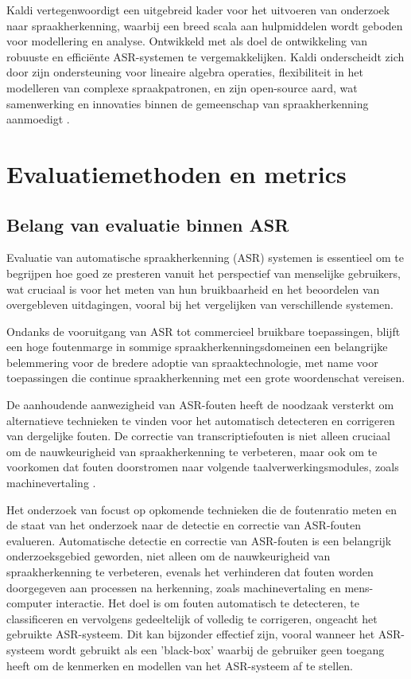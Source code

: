 Kaldi vertegenwoordigt een uitgebreid kader voor het uitvoeren van onderzoek naar spraakherkenning, waarbij een breed scala aan hulpmiddelen wordt geboden voor modellering en analyse. Ontwikkeld met als doel de ontwikkeling van robuuste en efficiënte ASR-systemen te vergemakkelijken. Kaldi onderscheidt zich door zijn ondersteuning voor lineaire algebra operaties, flexibiliteit in het modelleren van complexe spraakpatronen, en zijn open-source aard, wat samenwerking en innovaties binnen de gemeenschap van spraakherkenning aanmoedigt \autocite{Povey_ASRU2011}.


\section{Evaluatiemethoden en metrics}
\subsection{Belang van evaluatie binnen ASR}
Evaluatie van automatische spraakherkenning (ASR) systemen is essentieel 
om te begrijpen hoe goed ze presteren vanuit het perspectief van menselijke gebruikers, wat cruciaal is voor het meten van hun bruikbaarheid en het beoordelen van overgebleven uitdagingen, vooral bij het vergelijken van verschillende systemen. 

Ondanks de vooruitgang van ASR tot commercieel bruikbare toepassingen, blijft een hoge foutenmarge in sommige spraakherkenningsdomeinen een belangrijke belemmering voor de bredere adoptie van spraaktechnologie, met name voor toepassingen die continue spraakherkenning met een grote woordenschat vereisen.

De aanhoudende aanwezigheid van ASR-fouten heeft de noodzaak versterkt om alternatieve technieken te vinden voor het automatisch detecteren en corrigeren van dergelijke fouten. De correctie van transcriptiefouten is niet alleen cruciaal om de nauwkeurigheid van spraakherkenning te verbeteren, maar ook om te voorkomen dat fouten doorstromen naar volgende taalverwerkingsmodules, zoals machinevertaling \autocite{Errattahi_2018}.

Het onderzoek van \textcite{Errattahi_2018} focust op opkomende technieken die de foutenratio meten en de staat van het onderzoek naar de detectie en correctie van ASR-fouten evalueren. Automatische detectie en correctie van ASR-fouten is een belangrijk onderzoeksgebied geworden, niet alleen om de nauwkeurigheid van spraakherkenning te verbeteren, evenals het verhinderen dat fouten worden doorgegeven aan processen na herkenning, zoals machinevertaling en mens-computer interactie. Het doel is om fouten automatisch te detecteren, te classificeren en vervolgens gedeeltelijk of volledig te corrigeren, ongeacht het gebruikte ASR-systeem. Dit kan bijzonder effectief zijn, vooral wanneer het ASR-systeem wordt gebruikt als een 'black-box' waarbij de gebruiker geen toegang heeft om de kenmerken en modellen van het ASR-systeem af te stellen.

